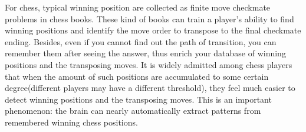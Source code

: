 For chess, typical winning position are collected 
as finite move checkmate problems in chess books. These kind
of books can train a player's ability to find winning positions and
identify the move order to transpose to the final checkmate
ending. Besides, even if you cannot find out the path of transition,
you can remember them after seeing the answer, thus enrich your
database of winning positions and the transposing moves.  It is widely
admitted among chess players that when the amount of such positions
are accumulated to some certain degree(different players may have a
different threshold), they feel much easier to detect winning
positions and the transposing moves.  This is an important
phenomenon: the brain can nearly automatically extract patterns from
remembered winning chess positions.


 
 
